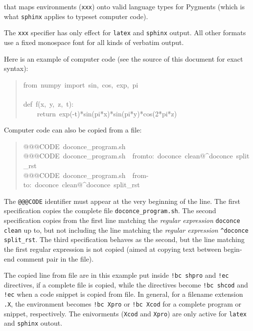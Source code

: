 \documentclass[a4paper]{article}
\begin{document}
that maps environments (\texttt{xxx}) onto valid language types for
Pygments (which is what \texttt{sphinx} applies to typeset computer code).

The \texttt{xxx} specifier has only effect for \texttt{latex} and
\texttt{sphinx} output. All other formats use a fixed monospace font for all
kinds of verbatim output.

Here is an example of computer code (see the source of this document
for exact syntax):
%
\begin{quote}{\ttfamily \raggedright \noindent
from~numpy~import~sin,~cos,~exp,~pi\\
~\\
def~f(x,~y,~z,~t):\\
~~~~return~exp(-t)*sin(pi*x)*sin(pi*y)*cos(2*pi*z)
}
\end{quote}



Computer code can also be copied from a file:
%
\begin{quote}{\ttfamily \raggedright \noindent
@@@CODE~doconce\_program.sh\\
@@@CODE~doconce\_program.sh~~fromto:~doconce~clean@\textasciicircum{}doconce~split\_rst\\
@@@CODE~doconce\_program.sh~~from-to:~doconce~clean@\textasciicircum{}doconce~split\_rst
}
\end{quote}

The \texttt{@@@CODE} identifier must appear at the very beginning of the line.
The first specification copies the complete file \texttt{doconce\_program.sh}.
The second specification copies from the first line matching the \emph{regular
expression} \texttt{doconce clean} up to, but not including the line
matching the \emph{regular expression} \texttt{\textasciicircum{}doconce split\_rst}.
The third specification behaves as the second, but the line matching
the first regular expression is not copied (aimed at copying
text between begin-end comment pair in the file).

The copied line from file are in this example put inside \texttt{!bc shpro}
and \texttt{!ec} directives, if a complete file is copied, while the
directives become \texttt{!bc shcod} and \texttt{!ec} when a code snippet is copied
from file. In general, for a filename extension \texttt{.X}, the environment
becomes \texttt{!bc Xpro} or \texttt{!bc Xcod} for a complete program or snippet,
respectively. The enivorments (\texttt{Xcod} and \texttt{Xpro}) are only active
for \texttt{latex} and \texttt{sphinx} outout.
\end{document}
